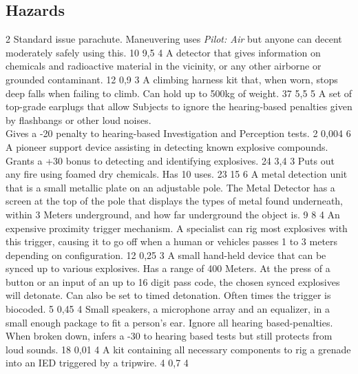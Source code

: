 \subsection{Hazards}
\vspace{10mm}
\begin{multicols}{2}
    {Standard issue parachute.
        Maneuvering uses \emph{Pilot: Air}
        but anyone can decent moderately safely using this.}
    {10}
    {9,5}
    {4}
    {A detector that gives information on chemicals and radioactive material in the vicinity,
	or any other airborne or grounded contaminant.
	}{12}
    {0,9}
    {3}
    {A climbing harness kit that, when worn, stops deep falls when failing to climb.
        Can hold up to 500kg of weight.}
    {37}
    {5,5}
    {5}
    {A set of top-grade earplugs that allow Subjects
        to ignore the hearing-based penalties given by flashbangs or other loud noises.\\
        Gives a -20 penalty to hearing-based Investigation and Perception tests.}
    {2}
    {0,004}
    {6}
    {A pioneer support device assisting in detecting known explosive compounds.
        Grants a +30 bonus to detecting and identifying explosives.}
    {24}
    {3,4}
    {3}
    {Puts out any fire using foamed dry chemicals. Has 10 uses.}
    {23}
    {15}
    {6}
    {A metal detection unit that is a small metallic plate on an adjustable pole.
        The Metal Detector has a screen at the top of the pole
        that displays the types of metal found underneath,
        within 3 Meters underground,
        and how far underground the object is.}
    {9}
    {8}
    {4}
    {An expensive proximity trigger mechanism.
        A specialist can rig most explosives with this trigger,
        causing it to go off when a human or vehicles passes
        1 to 3 meters depending on configuration.}
    {12}
    {0,25}
    {3}
    {A small hand-held device that can be synced up to various explosives.
        Has a range of 400 Meters.
        At the press of a button or an input of an up to 16 digit pass code,
        the chosen synced explosives will detonate.
        Can also be set to timed detonation.
        Often times the trigger is biocoded.}
    {5}
    {0,45}
    {4}
    {Small speakers, a microphone array and an equalizer,
        in a small enough package to fit a person's ear.
        Ignore all hearing based-penalties.\\
        When broken down, infers a -30 to hearing based tests
        but still protects from loud sounds.}
    {18}
    {0,01}
    {4}
    {A kit containing all necessary components to rig a grenade
        into an IED triggered by a tripwire.}
    {4}
    {0,7}
    {4}
\end{multicols}

